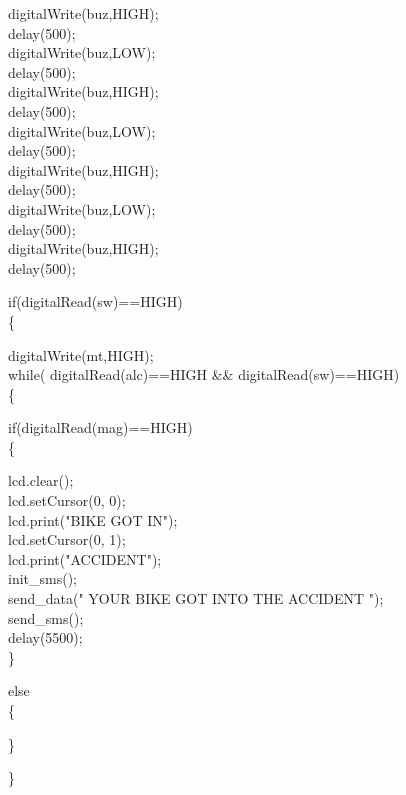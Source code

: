 digitalWrite(buz,HIGH);\\
delay(500);\\
digitalWrite(buz,LOW);\\
delay(500);\\
digitalWrite(buz,HIGH);\\
delay(500);\\
digitalWrite(buz,LOW);\\
delay(500);\\
digitalWrite(buz,HIGH);\\
delay(500);\\
digitalWrite(buz,LOW);\\
delay(500);\\
digitalWrite(buz,HIGH);\\
delay(500);\\
\vspace{.3cm}

if(digitalRead(sw)==HIGH)\\
\{  \vspace{.3cm}

digitalWrite(mt,HIGH);\\
while( digitalRead(alc)==HIGH \&\& digitalRead(sw)==HIGH)\\
\{\vspace{.3cm}

if(digitalRead(mag)==HIGH)\\
\{\vspace{.3cm}

lcd.clear();\\
lcd.setCursor(0, 0);\\
lcd.print("BIKE GOT IN");\\
lcd.setCursor(0, 1);\\
lcd.print("ACCIDENT");\\

init\_sms();\\
send\_data(" YOUR BIKE GOT INTO THE ACCIDENT ");\\
send\_sms();\\

delay(5500);\\
\} \vspace{.3cm}

else\\
\{\vspace{.3cm}

\}\vspace{.3cm}

\}\vspace{.3cm}

